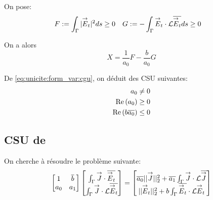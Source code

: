         On pose:
        \begin{align*}
          F&:= \int_\Gamma | {\overset{\rightarrow}{E}}_t | ^2 ds \ge 0 & G &:= -\int_\Gamma {\overset{\rightarrow}{E}}_t \cdot \mathcal{L}{\overline{{\overset{\rightarrow}{E}}_t}} ds \ge 0
        \end{align*}

        On a alors
        \begin{equation}
          \label{eq:unicite:form_var:decomp_cgu_ci1_a1_nul}
          X = \frac{1}{a_0}F - \frac{b}{a_0}G
        \end{equation}

        De \eqref{eq:unicite:form_var:cgu}, on déduit des CSU suivantes:
        \begin{align}
          a_0 \not= 0\\
          \operatorname{Re}\left(a_0\right) \ge 0\\
          \operatorname{Re}\left(b{\overline{a_0}}\right) \le 0
        \end{align}

    \subsection{CSU de \cite{stupfel_implementation_2015}}

      On cherche à résoudre le problème suivante:
      \[
        \begin{bmatrix}
          1 & {\overline{b}} \\
          a_0 & a_1
        \end{bmatrix}
        \begin{bmatrix}
          \int_\Gamma {\overset{\rightarrow}{J}} \cdot {\overline{{\overset{\rightarrow}{E}}_t}} \\
          \int_\Gamma {\overset{\rightarrow}{J}}\cdot \mathcal{L}{\overline{{\overset{\rightarrow}{E}}_t}}
        \end{bmatrix}
        =
        \begin{bmatrix}
          {\overline{a_0}}||{\overset{\rightarrow}{J}}||_2^2 + {\overline{a_1}}\int_\Gamma {\overset{\rightarrow}{J}} \cdot \mathcal{L}{\overline{{\overset{\rightarrow}{J}}}} \\
          ||{\overset{\rightarrow}{E}}_t||_2^2 + b\int_\Gamma {\overline{{\overset{\rightarrow}{E}}_t}} \cdot \mathcal{L}{\overset{\rightarrow}{E}}_t
        \end{bmatrix}
      \]

